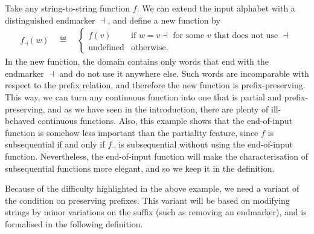 \begin{myexample}[Endmarkers] \label{ex:endmarker} Take any string-to-string function $f$. We can  extend the input alphabet with a distinguished endmarker $\dashv$, and define a new function by 
\begin{align*}
f_\dashv(w) \quad \eqdef \quad
\begin{cases}
    f(v) & \text{if $w = v\dashv$ for some $v$ that does not use $\dashv$}\\
    \text{undefined} & \text{otherwise}.
\end{cases}
\end{align*}
In the new function, the domain contains only words that end with the endmarker $\dashv$ and do not use it anywhere else. Such words are incomparable with respect to the prefix relation, and therefore the new function is prefix-preserving. This way, we can turn any continuous function into one that is partial and prefix-preserving, and as we have seen in the introduction, there are plenty of ill-behaved continuous functions. Also, this example shows that the end-of-input function is somehow less important than the partiality feature, since $f$ is subsequential if and only if $f_\dashv$ is subsequential without using the end-of-input function. Nevertheless, the end-of-input function will make the characterisation of subsequential functions more elegant, and so we keep it in the definition.
\end{myexample}

Because of the difficulty highlighted in the above example, we need a variant of the condition on preserving prefixes. This variant will be based on modifying strings by minor variations on the suffix (such as removing an endmarker), and is formalised in the following definition.



